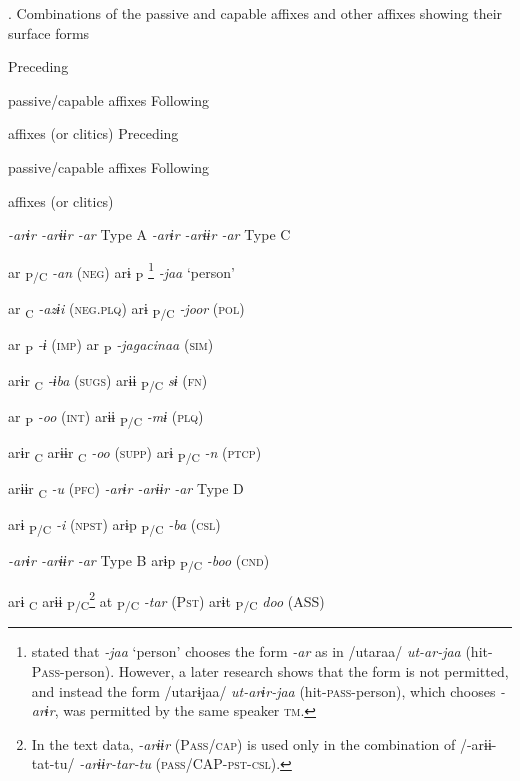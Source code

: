 \begin{table}
\caption{\label{tab:key:65}. Combinations of the passive and capable affixes and other affixes showing their surface forms}

Preceding

passive/capable affixes  Following

affixes (or clitics)    Preceding

passive/capable affixes  Following

affixes (or clitics)

\textit{{}-arɨr  {}-arɨɨr  {}-ar} Type A    \textit{{}-arɨr  {}-arɨɨr  {}-ar} Type C

    ar\textsubscript{ P/C}  \textit{{}-an} (\textsc{neg})    arɨ\textsubscript{ P}\textstyleFootnoteSymbol{} \footnote{\citet[70]{Niinaga2010} stated that \textit{{}-jaa} ‘person’ chooses the form \textit{{}-ar} as in /utaraa/ \textit{ut-ar-jaa} (hit-P\textsc{ass}-person). However, a later research shows that the form is not permitted, and instead the form /utarɨjaa/ \textit{ut-arɨr-jaa} (hit-\textsc{pass}-person), which chooses \textit{{}-arɨr}, was permitted by the same speaker \textsc{tm}.}      \textit{{}-jaa} ‘person’

    ar\textsubscript{ C}  \textit{{}-azɨi} (\textsc{neg}.\textsc{plq})    arɨ\textsubscript{ P/C}      \textit{{}-joor} (\textsc{pol})

    ar \textsubscript{P}  \textit{{}-ɨ} (\textsc{imp})        ar\textsubscript{ P}  \textit{{}-jagacinaa} (\textsc{sim})

arɨr\textsubscript{ C}      \textit{{}-ɨba} (\textsc{sugs})      arɨɨ\textsubscript{ P/C}    \textit{sɨ}  (\textsc{fn})

    ar\textsubscript{ P}  \textit{{}-oo} (\textsc{int})      arɨɨ\textsubscript{ P/C}    \textit{{}-mɨ} (\textsc{plq})

arɨr\textsubscript{ C}  arɨɨr\textsubscript{ C}    \textit{{}-oo} (\textsc{supp})    arɨ\textsubscript{ P/C}      \textit{{}-n} (\textsc{ptcp})

  arɨɨr\textsubscript{ C}    \textit{{}-u} (\textsc{pfc})    \textit{{}-arɨr  {}-arɨɨr  {}-ar} Type D

arɨ\textsubscript{ P/C}      \textit{{}-i} (\textsc{npst})    arɨp\textsubscript{ P/C}      \textit{{}-ba} (\textsc{csl})

\textit{{}-arɨr  {}-arɨɨr  {}-ar} Type B    arɨp\textsubscript{ P/C}      \textit{{}-boo} (\textsc{cnd})

arɨ\textsubscript{ C}  arɨɨ\textsubscript{ P/C}\footnote{In the text data, \textit{{}-arɨɨr} (P\textsc{ass}/\textsc{cap}) is used only in the combination of /-arɨɨ-tat-tu/ \textit{{}-arɨɨr-tar-tu} (\textsc{pass}/CAP-\textsc{pst}-\textsc{csl}).}  at\textsubscript{ P/C}  \textit{{}-tar} (P\textsc{st})    arɨt\textsubscript{ P/C}      \textit{doo}  (ASS)


\end{table}
